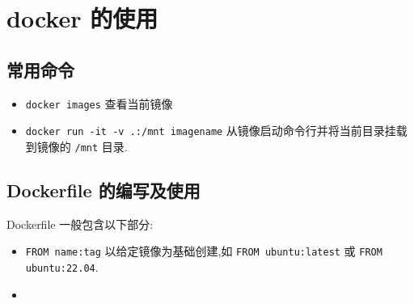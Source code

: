 
\usepackage{../../lectures_preamble}


    \section{docker 的使用}
    \subsection{常用命令}
    \begin{itemize}
        \item \texttt{docker images} 查看当前镜像
        \item \texttt{docker run -it -v .:/mnt imagename} 从镜像启动命令行并将当前目录挂载到镜像的 \texttt{/mnt} 目录.
    \end{itemize}
    \subsection{Dockerfile 的编写及使用}
    Dockerfile 一般包含以下部分:
    \begin{itemize}
        \item \texttt{FROM name:tag} 以给定镜像为基础创建,如 \texttt{FROM ubuntu:latest} 或 \texttt{FROM ubuntu:22.04}.
        \item \texttt{}
    \end{itemize}

